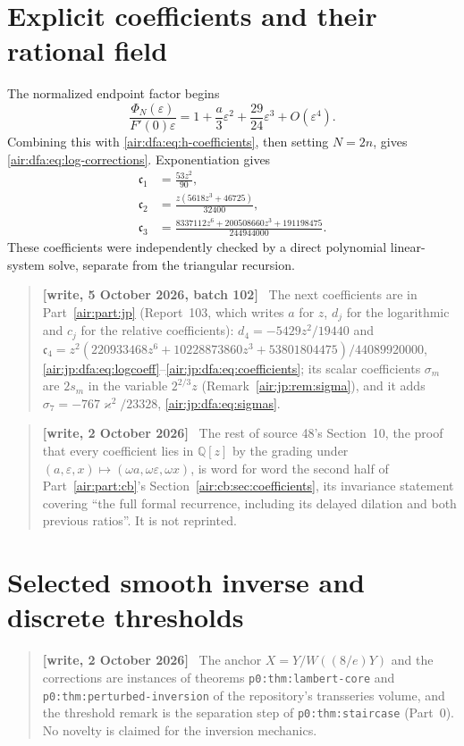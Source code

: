 \documentclass[11pt,letterpaper]{article}
\numberwithin{equation}{section}
\theoremstyle{remark}
\newcommand{\Q}{\mathbb{Q}}
\newcommand{\eps}{\varepsilon}
\newenvironment{writenote}{\par\smallskip\begin{quote}\small\textbf{[write, 2 October 2026]}\ }{\end{quote}\smallskip}
\newenvironment{writenotejp}{\par\smallskip\begin{quote}\small\textbf{[write, 5 October 2026, batch 102]}\ }{\end{quote}\smallskip}
\newcommand{\repopath}[1]{\nolinkurl{#1}}
\begin{document}
\section{Explicit coefficients and their rational field}\label{air:dfa:sec:coefficients}

The normalized endpoint factor begins
\[
\frac{\Phi_N(\eps)}{F'(0)\eps}
=1+\frac a3\eps^2+\frac{29}{24}\eps^3+O(\eps^4).
\]
Combining this with \eqref{air:dfa:eq:h-coefficients}, then setting $N=2n$,
gives \eqref{air:dfa:eq:log-corrections}. Exponentiation gives
\begin{equation}\label{air:dfa:eq:relative-coefficients}
\begin{aligned}
\mathfrak c_1&=\frac{53z^2}{90},\\
\mathfrak c_2&=\frac{z(5618z^3+46725)}{32400},\\
\mathfrak c_3&=\frac{8337112z^6+200508660z^3+191198475}{244944000}.
\end{aligned}
\end{equation}
These coefficients were independently checked by a direct polynomial
linear-system solve, separate from the triangular recursion.
\begin{writenotejp}
The next coefficients are in Part~\ref{air:part:jp} (Report~103, which writes $a$ for $z$, $d_j$ for the logarithmic and $c_j$ for the relative coefficients): $d_4=-5429z^2/19440$ and $\mathfrak c_4=z^2(220933468z^6+10228873860z^3+53801804475)/44089920000$, \eqref{air:jp:dfa:eq:logcoeff}--\eqref{air:jp:dfa:eq:coefficients}; its scalar coefficients $\sigma_m$ are $2s_m$ in the variable $2^{2/3}z$ (Remark~\ref{air:jp:rem:sigma}), and it adds $\sigma_7=-767\varkappa^2/23328$, \eqref{air:jp:dfa:eq:sigmas}.
\end{writenotejp}

\begin{writenote}
The rest of source 48's Section~10, the proof that every coefficient lies in $\Q[z]$ by the grading under $(a,\eps,x)\mapsto(\omega a,\omega\eps,\omega x)$, is word for word the second half of Part~\ref{air:part:cb}'s Section~\ref{air:cb:sec:coefficients}, its invariance statement covering ``the full formal recurrence, including its delayed dilation and both previous ratios''. It is not reprinted.
\end{writenote}

\section{Selected smooth inverse and discrete thresholds}\label{air:dfa:sec:inverse}
\begin{writenote}
The anchor $X=Y/W((8/e)Y)$ and the corrections are instances of theorems \repopath{p0:thm:lambert-core} and \repopath{p0:thm:perturbed-inversion} of the repository's transseries volume, and the threshold remark is the separation step of \repopath{p0:thm:staircase} (Part~0). No novelty is claimed for the inversion mechanics.
\end{writenote}
\end{document}

